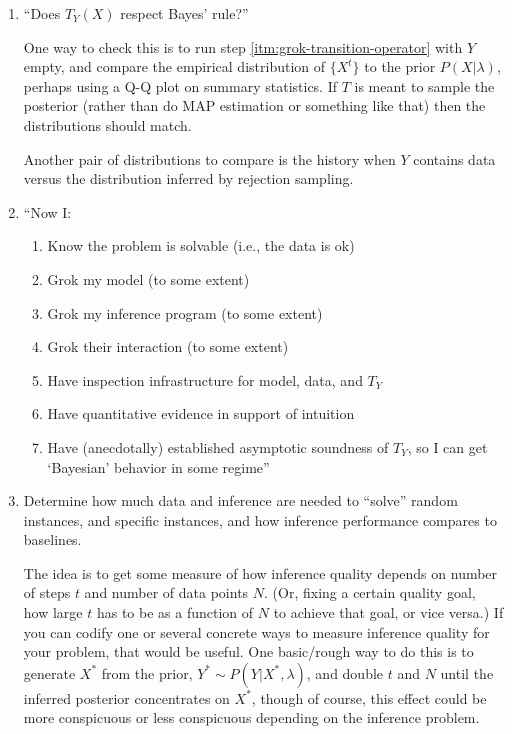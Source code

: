 \documentclass[11pt]{article}
\begin{document}
\begin{enumerate}
  \item ``Does $T_Y(X)$ respect Bayes' rule?''

    One way to check this is to run step \ref{itm:grok-transition-operator} with
    $Y$ empty, and compare the empirical distribution of $\{X^t\}$ to the prior
    $P(X|\lambda)$, perhaps using a Q-Q plot on summary statistics.  If $T$ is
    meant to sample the posterior (rather than do MAP estimation or something
    like that) then the distributions should match.

    Another pair of distributions to compare is the history when $Y$ contains
    data versus the distribution inferred by rejection sampling.

  \item ``Now I:
    \begin{enumerate}
      \item Know the problem is solvable (i.e., the data is ok)
      \item Grok my model (to some extent)
      \item Grok my inference program (to some extent)
      \item Grok their interaction (to some extent)
      \item Have inspection infrastructure for model, data, and $T_Y$
      \item Have quantitative evidence in support of intuition
      \item Have (anecdotally) established asymptotic soundness of $T_Y$, so I
        can get `Bayesian' behavior in some regime''
    \end{enumerate}

  \item Determine how much data and inference are needed to ``solve'' random
    instances, and specific instances, and how inference performance compares to
    baselines.

    The idea is to get some measure of how inference quality depends on number
    of steps $t$ and number of data points $N$.  (Or, fixing a certain quality
    goal, how large $t$ has to be as a function of $N$ to achieve that goal, or
    vice versa.)  If you can codify one or several concrete ways to measure
    inference quality for your problem, that would be useful.  One basic/rough
    way to do this is to generate $X^*$ from the prior, $Y^* \sim
    P(Y|X^*,\lambda)$, and double $t$ and $N$ until the inferred posterior
    concentrates on $X^*$, though of course, this effect could be more
    conspicuous or less conspicuous depending on the inference problem.


\end{enumerate}
\end{document}
